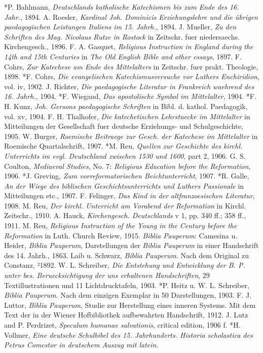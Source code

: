 *P. Bahlmann, \emph{Deutschlands katholische Katechismen bis zum Ende des 16. Jahr.}, 1894. A. Roesler, \emph{Kardinal Joh. Dominicis Erziehungslehre und die übrigen paedagogischen Leistungen Italiens im 15. Jahrh.}, 1894. J. Mueller, \emph{Zu den Schriften des Mag. Nicolaus Rutze in Rostock} in Zeitschr. fuer niedersaechs. Kirchengesch., 1896. F. A. Gasquet, \emph{Religious Instruction in England during the 14th and 15th Centuries} in \emph{The Old English Bible and other essays}, 1897. F. Cohrs, \emph{Zur Katechese am Ende des Mittelalters} in Zeitschr. fuer prakt. Theologie, 1898. *F. Cohrs, \emph{Die evangelischen Katechismusversuche vor Luthers Enchiridion}, vol. iv, 1902. J. Richter, \emph{Die paedagogische Literatur in Frankreich waehrend des 16. Jahrh.}, 1904. *F. Wiegand, \emph{Das apostolische Symbol im Mittelalter}, 1904. *F. H. Kunz, \emph{Joh. Gersons paedagogische Schriften} in Bibl. d. kathol. Paedagogik, vol. xv, 1904. F. H. Thalhofer, \emph{Die katechetischen Lehrstuecke im Mittelalter} in Mitteilungen der Gesellschaft fuer deutsche Erziehungs- und Schulgeschichte, 1905. W. Burger, \emph{Roemische Beitraege zur Gesch. der Katechese im Mittelalter} in Roemische Quartalschrift, 1907. *M. Reu, \emph{Quellen zur Geschichte des kirchl. Unterrichts im evgl. Deutschland zwischen 1530 und 1600}, part 2, 1906. G. S. Coulton, \emph{Mediaeval Studies}, No. 7: \emph{Religious Education before the Reformation}, 1906. *J. Greving, \emph{Zum vorreformatorischen Beichtunterricht}, 1907. *R. Galle, \emph{An der Wiege des biblischen Geschichtsunterrichts und Luthers Passionale} in Mitteilungen etc., 1907. F. Felinger, \emph{Das Kind in der altfranzoesischen Literatur}, 1908. M. Reu, \emph{Der kirchl. Unterricht am Vorabend der Reformation} in Kirchl. Zeitschr., 1910. A. Hauck, \emph{Kirchengesch. Deutschlands} v 1, pp. 340 ff.; 358 ff., 1911. M. Reu, \emph{Religious Instruction of the Young in the Century before the Reformation} in Luth. Church Review, 1915. \emph{Biblia Pauperum}: Camesina u. Heider, \emph{Biblia Pauperum}, Darstellungen der \emph{Biblia Pauperum} in einer Handschrift des 14. Jahrh., 1863. Laib u. Schwarz, \emph{Biblia Pauperum}. Nach dem Original zu Constanz, ²1892. W. L. Schreiber, \emph{Die Entstehung und Entwicklung der B. P. unter bes. Beruecksichtigung der uns erhaltenen Handschriften}, 29 Textillustrationen und 11 Lichtdrucktafeln, 1903. *P. Heitz u. W. L. Schreiber, \emph{Biblia Pauperum}. Nach dem einzigen Exemplar in 50 Darstellungen, 1903. F. J. Luttor, \emph{Biblia Pauperum}, Studie zur Herstellung eines inneren Systems. Mit dem Text der in der Wiener Hofbibliothek aufbewahrten Handschrift, 1912. J. Lutz and P. Perdrizet, \emph{Speculum humanae salvationis}, critical edition, 1906 f. *H. Vollmer, \emph{Eine deutsche Schulbibel des 15. Jahrhunderts. Historia scholastica des Petrus Comestor in deutschem Auszug mit latein.}
